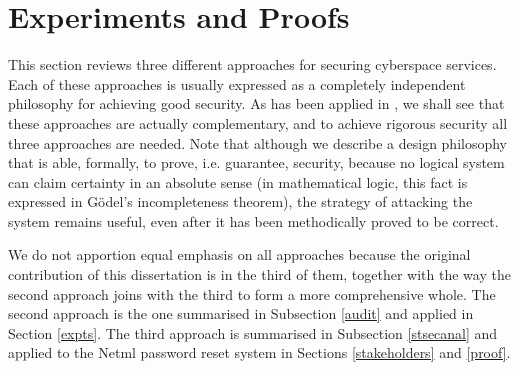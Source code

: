 \section{Experiments and Proofs}

This section reviews three different approaches for securing cyberspace services. Each of these approaches is usually expressed as a completely independent philosophy for achieving good security. As has been applied in \cite{sheniar2018experiments}, we shall see that these approaches are actually complementary, and to achieve rigorous security all three approaches are needed. Note that although we describe a design philosophy that is able, formally, to prove, i.e. guarantee, security, because no logical system can claim certainty in an absolute sense (in mathematical logic, this fact is expressed in G\"odel's incompleteness theorem), the strategy of attacking the system remains useful, even after it has been methodically proved to be correct.

We do not apportion equal emphasis on all approaches because the original contribution of this dissertation is in the third of them, together with the way the second approach joins with the third to form a more comprehensive whole. The second approach is the one summarised in Subsection \ref{audit} and applied in Section \ref{expts}. The third approach is summarised in Subsection \ref{stsecanal} and applied to the Netml password reset system in Sections \ref{stakeholders} and \ref{proof}.


